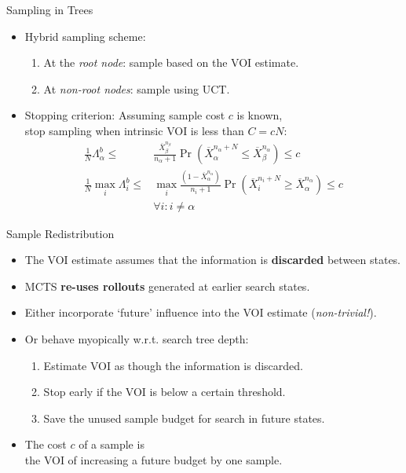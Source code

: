 \documentclass{beamer}
\begin{document}
\begin{frame}{Sampling in Trees}
\begin{itemize}
\item Hybrid sampling scheme:
\begin{enumerate}
\item At the {\it root node}: sample based on the VOI estimate.
\item At {\it non-root nodes}: sample using UCT.
\end{enumerate}
\item Stopping criterion: Assuming sample cost $c$ is known,\\
\hspace{1em}stop sampling when intrinsic VOI is less than $C=cN$:
\begin{align*}
\frac 1 N \Lambda_\alpha^b \le&\frac {\overline X_\beta^{n_\beta}}
  {n_\alpha+1}\Pr(\overline X_\alpha^{n_\alpha+N}\le\overline
  X_\beta^{n_\alpha})\le c\\
\frac 1 N \max_i\Lambda_i^b\le &\max_i\frac {(1-\overline X_\alpha^{n_\alpha})} {n_i+1}\Pr(\overline
  X_i^{n_i+N}\ge\overline X_\alpha^{n_\alpha})\le c\\
    &\forall i: i\ne\alpha
\end{align*}
\end{itemize}
\end{frame}

\begin{frame}{Sample Redistribution}
\begin{itemize}
\item The VOI estimate assumes that the information is {\bf discarded}
  between states.
\item MCTS {\bf re-uses rollouts} generated at earlier search states.
\vspace{\baselineskip}
\item Either incorporate `future' influence into the VOI estimate
  ({\it non-trivial!}).
\item Or behave myopically w.r.t. search tree depth:
\begin{enumerate}
\item Estimate VOI as though the information is discarded.
\item Stop early if the VOI is below a certain threshold.
\item Save the unused sample budget for search in future states.
\end{enumerate}
\item The cost $c$ of a sample  is\\\hspace{1em} the VOI of increasing a
  future budget by one sample.
\end{itemize}
\end{frame}
\end{document}
